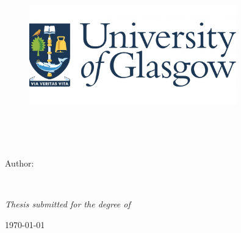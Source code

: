 
\begin{titlepage}
\begin{center}


\begin{figure}
    \begin{center}
    \includegraphics[width=0.8\textwidth]{Figures/logo.jpg}
    \end{center}
\end{figure}

\HRule \\[0.4cm] %
{\Large \bfseries \ttitle\par}\vspace{0.4cm} %
\HRule \\[1.5cm] %
    
\begin{minipage}[t]{1.0\textwidth}
\begin{flushleft} \large
Author: \authorname\\[2cm]
\end{flushleft}
\end{minipage}\\[1cm]
    
\vfill

\large \textit{Thesis submitted for the degree of \degreename}\\[2cm]

\deptname
    
\vfill

{\large \today}\\[4cm] %
    
\vfill
\end{center}
\end{titlepage}
